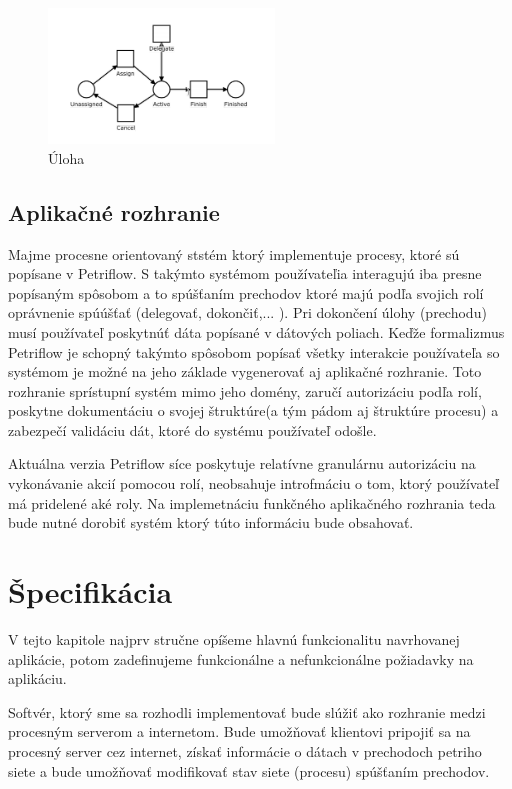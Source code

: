 \begin{figure}[!htbp]
 	\centering
 	\includegraphics[width=6cm]{img/task_transition.png}
 	\caption{Úloha}
 	\label{task}
\end{figure} 


  

\subsection{Aplikačné rozhranie} 

Majme procesne orientovaný ststém ktorý implementuje procesy, ktoré sú popísane v Petriflow. S takýmto systémom používateľia interagujú iba presne popísaným spôsobom a to spúšťaním prechodov ktoré majú podľa svojich rolí oprávnenie spúúšťať (delegovať, dokončiť,... ). Pri dokončení úlohy (prechodu) musí používateľ poskytnúť dáta popísané v dátových poliach. 
Keďže formalizmus Petriflow je schopný takýmto spôsobom popísať všetky interakcie používateľa so systémom je možné na jeho základe vygenerovať aj aplikačné rozhranie. Toto rozhranie sprístupní systém mimo jeho domény, zaručí autorizáciu podľa rolí, poskytne dokumentáciu o svojej štruktúre(a tým pádom aj štruktúre procesu) a zabezpečí validáciu dát, ktoré do systému používateľ odošle.

Aktuálna verzia Petriflow síce poskytuje relatívne granulárnu autorizáciu na vykonávanie akcií pomocou rolí, neobsahuje introfmáciu o tom, ktorý používateľ má pridelené aké roly. Na implemetnáciu funkčného aplikačného rozhrania teda bude nutné dorobiť systém ktorý túto informáciu bude obsahovať.

  

  
\section{Špecifikácia} 
V tejto kapitole najprv stručne opíšeme hlavnú funkcionalitu navrhovanej aplikácie, potom zadefinujeme funkcionálne a nefunkcionálne požiadavky na aplikáciu. 

Softvér, ktorý sme sa rozhodli implementovať bude slúžiť ako rozhranie medzi procesným serverom a internetom. Bude umožňovať klientovi pripojiť sa na procesný server cez internet, získať informácie o dátach v prechodoch petriho siete a bude umožňovať modifikovať stav siete (procesu) spúšťaním prechodov.  

